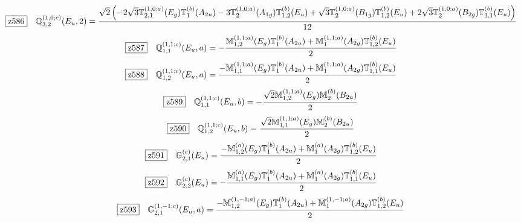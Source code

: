 \documentclass[fleqn,10pt,landscape]{jsarticle}
\begin{document}
\begin{dmath*}
\hspace*{3mm}\fbox{z586}\quad \mathbb{Q}_{3,2}^{(1,0;c)}(E_{u},2)=\frac{\sqrt{2} \left(- 2 \sqrt{3} \mathbb{T}_{2,1}^{(1,0;a)}(E_{g}) \mathbb{T}_{1}^{(b)}(A_{2u}) - 3 \mathbb{T}_{2}^{(1,0;a)}(A_{1g}) \mathbb{T}_{1,2}^{(b)}(E_{u}) + \sqrt{3} \mathbb{T}_{2}^{(1,0;a)}(B_{1g}) \mathbb{T}_{1,2}^{(b)}(E_{u}) + 2 \sqrt{3} \mathbb{T}_{2}^{(1,0;a)}(B_{2g}) \mathbb{T}_{1,1}^{(b)}(E_{u})\right)}{12}
\end{dmath*}
\begin{dmath*}
\hspace*{3mm}\fbox{z587}\quad \mathbb{Q}_{1,1}^{(1,1;c)}(E_{u},a)=- \frac{\mathbb{M}_{1,2}^{(1,1;a)}(E_{g}) \mathbb{T}_{1}^{(b)}(A_{2u}) + \mathbb{M}_{1}^{(1,1;a)}(A_{2g}) \mathbb{T}_{1,2}^{(b)}(E_{u})}{2}
\end{dmath*}
\begin{dmath*}
\hspace*{3mm}\fbox{z588}\quad \mathbb{Q}_{1,2}^{(1,1;c)}(E_{u},a)=\frac{- \mathbb{M}_{1,1}^{(1,1;a)}(E_{g}) \mathbb{T}_{1}^{(b)}(A_{2u}) + \mathbb{M}_{1}^{(1,1;a)}(A_{2g}) \mathbb{T}_{1,1}^{(b)}(E_{u})}{2}
\end{dmath*}
\begin{dmath*}
\hspace*{3mm}\fbox{z589}\quad \mathbb{Q}_{1,1}^{(1,1;c)}(E_{u},b)=- \frac{\sqrt{2} \mathbb{M}_{1,2}^{(1,1;a)}(E_{g}) \mathbb{M}_{2}^{(b)}(B_{2u})}{2}
\end{dmath*}
\begin{dmath*}
\hspace*{3mm}\fbox{z590}\quad \mathbb{Q}_{1,2}^{(1,1;c)}(E_{u},b)=\frac{\sqrt{2} \mathbb{M}_{1,1}^{(1,1;a)}(E_{g}) \mathbb{M}_{2}^{(b)}(B_{2u})}{2}
\end{dmath*}
\begin{dmath*}
\hspace*{3mm}\fbox{z591}\quad \mathbb{G}_{2,1}^{(c)}(E_{u})=\frac{- \mathbb{M}_{1,2}^{(a)}(E_{g}) \mathbb{T}_{1}^{(b)}(A_{2u}) + \mathbb{M}_{1}^{(a)}(A_{2g}) \mathbb{T}_{1,2}^{(b)}(E_{u})}{2}
\end{dmath*}
\begin{dmath*}
\hspace*{3mm}\fbox{z592}\quad \mathbb{G}_{2,2}^{(c)}(E_{u})=- \frac{\mathbb{M}_{1,1}^{(a)}(E_{g}) \mathbb{T}_{1}^{(b)}(A_{2u}) + \mathbb{M}_{1}^{(a)}(A_{2g}) \mathbb{T}_{1,1}^{(b)}(E_{u})}{2}
\end{dmath*}
\begin{dmath*}
\hspace*{3mm}\fbox{z593}\quad \mathbb{G}_{2,1}^{(1,-1;c)}(E_{u},a)=\frac{- \mathbb{M}_{1,2}^{(1,-1;a)}(E_{g}) \mathbb{T}_{1}^{(b)}(A_{2u}) + \mathbb{M}_{1}^{(1,-1;a)}(A_{2g}) \mathbb{T}_{1,2}^{(b)}(E_{u})}{2}
\end{dmath*}
\end{document}
